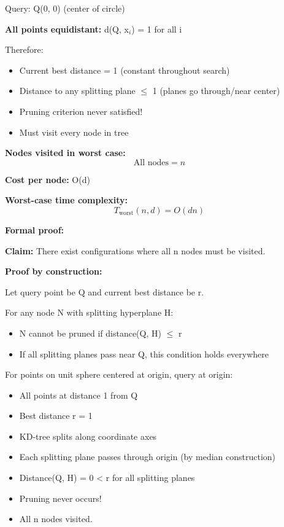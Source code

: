 \documentclass[12pt]{article}
\begin{document}
\begin{solution}
Query: Q(0, 0) (center of circle)

\textbf{All points equidistant:} d(Q, x$_i$) = 1 for all i

Therefore:
\begin{itemize}
    \item Current best distance = 1 (constant throughout search)
    \item Distance to any splitting plane $\leq$ 1 (planes go through/near center)
    \item Pruning criterion never satisfied!
    \item Must visit every node in tree
\end{itemize}

\textbf{Nodes visited in worst case:}
\[
\text{All nodes} = n
\]

\textbf{Cost per node:} O(d)

\textbf{Worst-case time complexity:}
\[
\boxed{T_{\text{worst}}(n, d) = O(dn)}
\]

\textbf{Formal proof:}

\textbf{Claim:} There exist configurations where all n nodes must be visited.

\textbf{Proof by construction:}

Let query point be Q and current best distance be r.

For any node N with splitting hyperplane H:
\begin{itemize}
    \item N cannot be pruned if distance(Q, H) $\leq$ r
    \item If all splitting planes pass near Q, this condition holds everywhere
\end{itemize}

For points on unit sphere centered at origin, query at origin:
\begin{itemize}
    \item All points at distance 1 from Q
    \item Best distance r = 1
    \item KD-tree splits along coordinate axes
    \item Each splitting plane passes through origin (by median construction)
    \item Distance(Q, H) = 0 < r for all splitting planes
    \item Pruning never occurs!
    \item All n nodes visited. \quad \checkmark
\end{itemize}


\end{solution}
\end{document}
